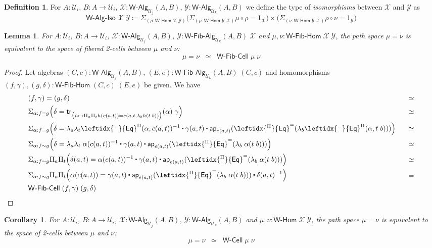\documentclass[11pt]{article}
\newcommand{\X}{\mathcal{X}}
\newcommand{\Y}{\mathcal{Y}}
\newcommand{\comp}{\circ}
\newcommand{\prd}[1]{\Pi_{#1}}
\newcommand{\sm}[1]{\Sigma_{#1}}
\newcommand{\lam}[1]{\lambda_{#1}}
\newcommand{\defeq}{\coloneqq}
\newcommand{\funext}{\leftidx{^\Pi}{\mathsf{Eq}}^{=}}
\newcommand{\happly}{\leftidx{^=}{\mathsf{Eq}}^{\Pi}}
\newcommand{\one}{\mathsf{1}}
\newcommand{\UU}{\mathcal{U}}
\newcommand{\WCell}{\mathsf{W}\text{-}\mathsf{Cell}}
\newcommand{\WFibCell}{\mathsf{W}\text{-}\mathsf{Fib}\text{-}\mathsf{Cell}}
\newcommand{\WAlg}{\mathsf{W}\text{-}\mathsf{Alg}}
\newcommand{\WFibAlg}{\mathsf{W}\text{-}\mathsf{Fib}\text{-}\mathsf{Alg}}
\newcommand{\WHom}{\mathsf{W}\text{-}\mathsf{Hom}}
\newcommand{\WFibHom}{\mathsf{W}\text{-}\mathsf{Fib}\text{-}\mathsf{Hom}}
\newcommand{\app}{\mathsf{ap}}
\newcommand{\trans}{\mathsf{tr}}
\newcommand{\WAlgIso}{\mathsf{W}\text{-}\mathsf{Alg}\text{-}\mathsf{Iso}}
\newcommand{\ct}{%
  \mathchoice{\mathbin{\raisebox{0.5ex}{$\displaystyle\centerdot$}}}%
             {\mathbin{\raisebox{0.5ex}{$\centerdot$}}}%
             {\mathbin{\raisebox{0.25ex}{$\scriptstyle\,\centerdot\,$}}}%
             {\mathbin{\raisebox{0.1ex}{$\scriptscriptstyle\,\centerdot\,$}}}}
\newtheorem{lemma}[theorem]{Lemma}
\newtheorem{corollary}[theorem]{Corollary}
\theoremstyle{definition}
\newtheorem{definition}[theorem]{Definition}
\begin{document}
\begin{definition}
For $A:\UU_i$, $B : A \to \UU_i$, $\X : \WAlg_{\UU_j}(A,B)$, $\Y : \WAlg_{\UU_k}(A,B)$ we define the type of \emph{isomorphisms} between $\X$ and $\Y$ as
\[\WAlgIso \; \X \; \Y \defeq \sm{(\rho : \WHom \; \X \; \Y)} \Big(\sm{(\mu : \WHom \; \Y \; \X)} \mu \comp \rho = \one_\X \Big) \times \Big(\sm{(\nu : \WHom \; \Y \; \X)} \rho \comp \nu = \one_\Y \Big) \] 
\end{definition}

\begin{lemma}\label{WFibHomSpace}
For $A:\UU_i$, $B : A \to \UU_i$, $\X : \WAlg_{\UU_j}(A,B)$, $\Y : \WFibAlg_{\UU_k}(A,B) \; \X$ and $\mu,\nu : \WFibHom \; \X \; \Y$, the path space $\mu = \nu$ is equivalent to the space of fibered 2-cells between $\mu$ and $\nu$:
\[ \mu = \nu \;\; \simeq \;\; \WFibCell \; \mu \; \nu \] 
\end{lemma}
\begin{proof}
Let algebras $(C,c) : \WAlg_{\UU_j}(A,B)$, $(E,e) : \WFibAlg_{\UU_k}(A,B) \; (C,c)$ and homomorphisms $(f,\gamma), (g,\delta) : \WFibHom \; (C,c) \; (E,e)$ be given. We have
\begin{alignat*}{4}
& (f,\gamma) = (g,\delta) & \simeq \\
& \sm{\alpha : f = g} \Big(\delta = \trans_{\big(h \mapsto \prd{a}\prd{t} h(c(a,t)) = e(a,t,\lam{b} h(t\;b))\big)}(\alpha) \; \gamma\Big) & \simeq \\
& \sm{\alpha : f = g} \Big(\delta = \lam{a} \lam{t} \happly(\alpha,c(a,t))^{-1} \ct \gamma(a,t) \ct \app_{e(a,t)}(\funext (\lam{b}\happly(\alpha,t \; b))) \Big) & \;\;\; \simeq \\
& \sm{\alpha : f \sim g} \Big(\delta = \lam{a} \lam{t} \; \alpha(c(a,t))^{-1} \ct \gamma(a,t) \ct \app_{e(a,t)}(\funext (\lam{b}\; \alpha(t \; b))) \Big) & \simeq \\
& \sm{\alpha : f \sim g} \prd{a}\prd{t}\Big(\delta(a,t) = \alpha(c(a,t))^{-1} \ct \gamma(a,t) \ct \app_{e(a,t)}(\funext (\lam{b}\; \alpha(t \; b))) \Big) & \simeq \\ 
& \sm{\alpha : f \sim g} \prd{a}\prd{t}\Big(\alpha(c(a,t)) = \gamma(a,t) \ct \app_{e(a,t)}(\funext (\lam{b}\; \alpha(t \; b))) \ct \delta(a,t)^{-1} \Big) & \equiv \\ 
& \WFibCell \; (f,\gamma) \; (g,\delta)
\end{alignat*}
\end{proof}

\begin{corollary}\label{WHomSpace}
For $A:\UU_i$, $B : A \to \UU_i$, $\X : \WAlg_{\UU_j}(A,B)$, $\Y : \WAlg_{\UU_k}(A,B)$ and $\mu,\nu : \WHom \; \X \; \Y$, the path space $\mu = \nu$ is equivalent to the space of 2-cells between $\mu$ and $\nu$:
\[ \mu = \nu \;\; \simeq \;\; \WCell \; \mu \; \nu \] 
\end{corollary}
\end{document}
